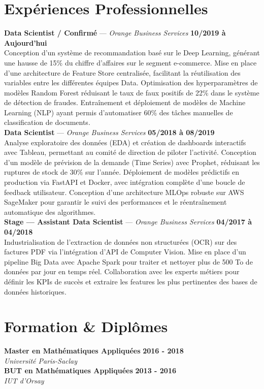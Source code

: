 \documentclass[11pt,a4paper]{article}
\begin{document}
\section*{Expériences Professionnelles}
\noindent \textbf{Data Scientist / Confirmé} --- \textit{Orange Business Services} \hfill \textbf{10/2019 à Aujourd'hui} \\
Conception d'un système de recommandation basé sur le Deep Learning, générant une hausse de 15\% du chiffre d'affaires sur le segment e-commerce. Mise en place d'une architecture de Feature Store centralisée, facilitant la réutilisation des variables entre les différentes équipes Data. Optimisation des hyperparamètres de modèles Random Forest réduisant le taux de faux positifs de 22\% dans le système de détection de fraudes. Entraînement et déploiement de modèles de Machine Learning (NLP) ayant permis d'automatiser 60\% des tâches manuelles de classification de documents. \\[0.3cm]
\noindent \textbf{Data Scientist} --- \textit{Orange Business Services} \hfill \textbf{05/2018 à 08/2019} \\
Analyse exploratoire des données (EDA) et création de dashboards interactifs avec Tableau, permettant au comité de direction de piloter l'activité. Conception d'un modèle de prévision de la demande (Time Series) avec Prophet, réduisant les ruptures de stock de 30\% sur l'année. Déploiement de modèles prédictifs en production via FastAPI et Docker, avec intégration complète d'une boucle de feedback utilisateur. Conception d'une architecture MLOps robuste sur AWS SageMaker pour garantir le suivi des performances et le réentraînement automatique des algorithmes. \\[0.3cm]
\noindent \textbf{Stage — Assistant Data Scientist} --- \textit{Orange Business Services} \hfill \textbf{04/2017 à 04/2018} \\
Industrialisation de l'extraction de données non structurées (OCR) sur des factures PDF via l'intégration d'API de Computer Vision. Mise en place d'un pipeline Big Data avec Apache Spark pour traiter et nettoyer plus de 500 To de données par jour en temps réel. Collaboration avec les experts métiers pour définir les KPIs de succès et extraire les features les plus pertinentes des bases de données historiques. \\[0.3cm]


\vspace{0.3cm}

\section*{Formation \& Diplômes}
\noindent \textbf{Master en Mathématiques Appliquées} \hfill \textbf{2016 - 2018} \\
\textit{Université Paris-Saclay} \\[0.3cm]
\noindent \textbf{BUT en Mathématiques Appliquées} \hfill \textbf{2013 - 2016} \\
\textit{IUT d'Orsay} \\[0.3cm]
\end{document}

